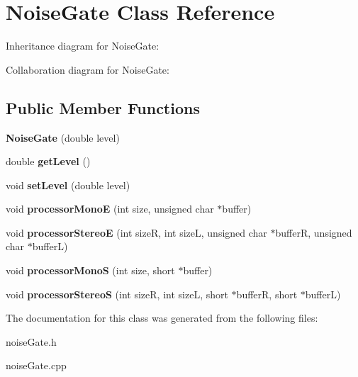 \hypertarget{classNoiseGate}{}\section{Noise\+Gate Class Reference}
\label{classNoiseGate}


Inheritance diagram for Noise\+Gate\+:


Collaboration diagram for Noise\+Gate\+:
\subsection*{Public Member Functions}
\begin{DoxyCompactItemize}
\item 
\mbox{\label{classNoiseGate_a595f0fbe191ba5eaed8b52c8f2c5049f}} 
{\bfseries Noise\+Gate} (double level)
\item 
\mbox{\label{classNoiseGate_a48958705ac7b9de4cfe5ae284b8fb4f6}} 
double {\bfseries get\+Level} ()
\item 
\mbox{\label{classNoiseGate_aa03603d23e350f5d9d1e0914de862f57}} 
void {\bfseries set\+Level} (double level)
\item 
\mbox{\label{classNoiseGate_ab2965cbd79e9bb7cd5d972967d3da678}} 
void {\bfseries processor\+MonoE} (int size, unsigned char $\ast$buffer)
\item 
\mbox{\label{classNoiseGate_a3b6bbb8efccac794fe3abf6dbbd92c1f}} 
void {\bfseries processor\+StereoE} (int sizeR, int sizeL, unsigned char $\ast$bufferR, unsigned char $\ast$bufferL)
\item 
\mbox{\label{classNoiseGate_a46b2ad11fa1dac657450c2299026bee4}} 
void {\bfseries processor\+MonoS} (int size, short $\ast$buffer)
\item 
\mbox{\label{classNoiseGate_aa45ac001ec6d3dd7ad935cf92266a285}} 
void {\bfseries processor\+StereoS} (int sizeR, int sizeL, short $\ast$bufferR, short $\ast$bufferL)
\end{DoxyCompactItemize}


The documentation for this class was generated from the following files\+:\begin{DoxyCompactItemize}
\item 
noise\+Gate.\+h\item 
noise\+Gate.\+cpp\end{DoxyCompactItemize}
